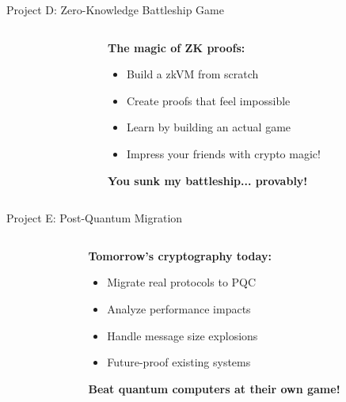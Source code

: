 \documentclass[aspectratio=169, lualatex, handout]{beamer}
\begin{document}
\begin{frame}{Project D: Zero-Knowledge Battleship Game}
	\begin{columns}[c]
		\begin{column}{0.5\textwidth}
		\end{column}
		\begin{column}{0.5\textwidth}
			\textbf{The magic of ZK proofs:}
			\begin{itemize}[<+->]
				\item Build a zkVM from scratch
				\item Create proofs that feel impossible
				\item Learn by building an actual game
				\item Impress your friends with crypto magic!
			\end{itemize}
			\vspace{0.5cm}
			\textcolor{cipherprimary}{\textbf{You sunk my battleship... provably!}}
		\end{column}
	\end{columns}
\end{frame}

\begin{frame}{Project E: Post-Quantum Migration}
	\begin{columns}[c]
		\begin{column}{0.5\textwidth}
		\end{column}
		\begin{column}{0.5\textwidth}
			\textbf{Tomorrow's cryptography today:}
			\begin{itemize}[<+->]
				\item Migrate real protocols to PQC
				\item Analyze performance impacts
				\item Handle message size explosions
				\item Future-proof existing systems
			\end{itemize}
			\vspace{0.5cm}
			\textcolor{cipherprimary}{\textbf{Beat quantum computers at their own game!}}
		\end{column}
	\end{columns}
\end{frame}
\end{document}

